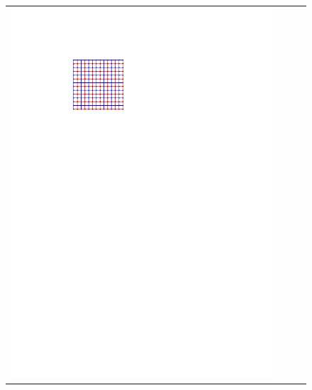 \documentclass{patmorin}
\begin{document}
\begin{figure}
\begin{tabular}{cccc}
    \includegraphics[page=2]{figs/omer} &

\end{tabular}
\end{figure}
\end{document}
